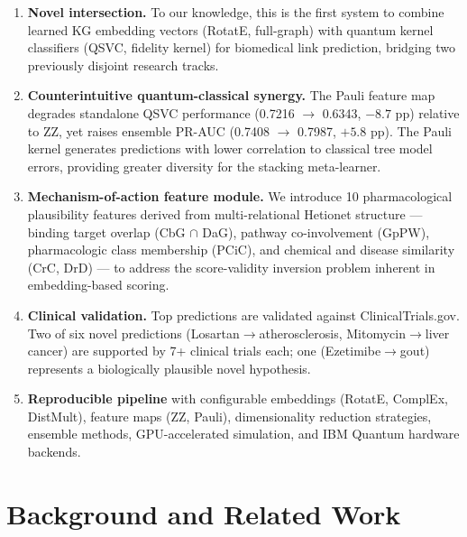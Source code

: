 \documentclass[twocolumn,10pt]{article}
\begin{document}
\begin{enumerate}[leftmargin=*, label=\arabic*.]

\item \textbf{Novel intersection.} To our knowledge, this is the first system to combine learned KG embedding vectors (RotatE, full-graph) with quantum kernel classifiers (QSVC, fidelity kernel) for biomedical link prediction, bridging two previously disjoint research tracks.

\item \textbf{Counterintuitive quantum-classical synergy.} The Pauli feature map degrades standalone QSVC performance (0.7216 $\to$ 0.6343, $-8.7$ pp) relative to ZZ, yet raises ensemble PR-AUC (0.7408 $\to$ 0.7987, $+5.8$ pp). The Pauli kernel generates predictions with lower correlation to classical tree model errors, providing greater diversity for the stacking meta-learner.

\item \textbf{Mechanism-of-action feature module.} We introduce 10 pharmacological plausibility features derived from multi-relational Hetionet structure --- binding target overlap (CbG $\cap$ DaG), pathway co-involvement (GpPW), pharmacologic class membership (PCiC), and chemical and disease similarity (CrC, DrD) --- to address the score-validity inversion problem inherent in embedding-based scoring.

\item \textbf{Clinical validation.} Top predictions are validated against ClinicalTrials.gov. Two of six novel predictions (Losartan$\to$atherosclerosis, Mitomycin$\to$liver cancer) are supported by 7+ clinical trials each; one (Ezetimibe$\to$gout) represents a biologically plausible novel hypothesis.

\item \textbf{Reproducible pipeline} with configurable embeddings (RotatE, ComplEx, DistMult), feature maps (ZZ, Pauli), dimensionality reduction strategies, ensemble methods, GPU-accelerated simulation, and IBM Quantum hardware backends.

\end{enumerate}

\section{Background and Related Work}
\end{document}
